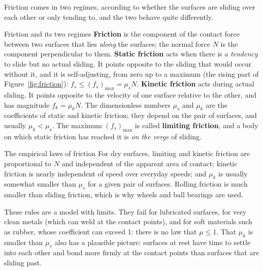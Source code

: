 Friction comes in two regimes, according to whether the surfaces are sliding over each other or only tending
to, and the two behave quite differently.

\begin{defbox}{Friction and its two regimes}
\textbf{Friction} is the component of the contact force between two surfaces that lies \emph{along} the
surfaces; the normal force $N$ is the component perpendicular to them. \textbf{Static friction} acts when
there is a \emph{tendency} to slide but no actual sliding. It points opposite to the sliding that would
occur without it, and it is self-adjusting, from zero up to a maximum (the rising part of Figure~\ref{fig:friction}): $f_s\le(f_s)_{\max}=\mu_s N$.
\textbf{Kinetic friction} acts during actual sliding. It points opposite to the velocity of one surface
relative to the other, and has magnitude $f_k=\mu_k N$. The dimensionless numbers $\mu_s$ and $\mu_k$ are
the coefficients of static and kinetic friction; they depend on the pair of surfaces, and usually
$\mu_k<\mu_s$. The maximum $(f_s)_{\max}$ is called \textbf{limiting friction}, and a body on which
static friction has reached it is \emph{on the verge} of sliding.
\end{defbox}

\begin{figure}[htbp]
\centering
{}
\end{figure}

\begin{keybox}{The empirical laws of friction}
For dry surfaces, limiting and kinetic friction are proportional to $N$ and independent of the apparent
area of contact; kinetic friction is nearly independent of speed over everyday speeds; and $\mu_k$ is
usually somewhat smaller than $\mu_s$ for a given pair of surfaces. Rolling friction is much smaller than
sliding friction, which is why wheels and ball bearings are used.
\end{keybox}

These rules are a model with limits. They fail for lubricated surfaces, for very clean metals (which can
weld at the contact points), and for soft materials such as rubber, whose coefficient can exceed 1: there
is no law that $\mu\le1$. That $\mu_k$ is smaller than $\mu_s$ also has a plausible picture: surfaces
at rest have time to settle into each other and bond more firmly at the contact points than surfaces
that are sliding past.

